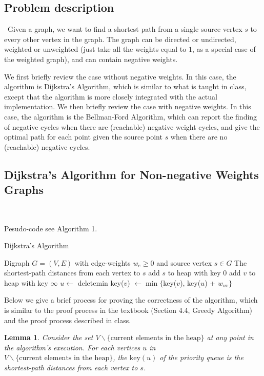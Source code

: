 \documentclass[11pt]{article}
\theoremstyle{plain}
\newtheorem{lemma}{Lemma}[section]
\begin{document}
\subsection{Problem description}\
Given a graph, we want to find a shortest path from a single source vertex $s$ to every other vertex 
in the graph. The graph can be directed or undirected, weighted or unweighted (just take all the 
weights equal to $1$, as a special case of the weighted graph), and can contain negative weights.

We first briefly review the case without negative weights. In this case, the algorithm is Dijkstra's 
Algorithm, which is similar to what is taught in class, except that the algorithm is more closely 
integrated with the actual implementation. We then briefly review the case with negative weights. 
In this case, the algorithm is the Bellman-Ford Algorithm, which can report the finding of negative 
cycles when there are (reachable) negative weight cycles, and give the optimal path for each point 
given the source point $s$ when there are no (reachable) negative cycles.

\subsection{Dijkstra's Algorithm for Non-negative Weights Graphs}\

Pesudo-code see Algorithm 1.

\begin{algorithm}
  \caption{Dijkstra's Algorithm}
  \begin{algorithmic}[1]
  \REQUIRE Digraph $G = (V, E)$ with edge-weights $w_e \geq 0$ and source vertex $s \in G$
  \ENSURE The shortest-path distances from each vertex to $s$
  \STATE add $s$ to heap with key $0$
      \STATE add $v$ to heap with key $\infty$
  \ENDFOR
      \STATE $u \leftarrow$ deletemin
          \STATE key($v$) $\leftarrow \min\{$key($v$), key($u$) + $w_{uv}\}$ 
      \ENDFOR
  \ENDWHILE
  \end{algorithmic}
  \end{algorithm}

  Below we give a brief process for proving the correctness of the algorithm, which is similar to 
  the proof process in the textbook (Section 4.4, Greedy Algorithm) and the proof process described in class.

  \begin{lemma}
    Consider the set $V \backslash \{\text{current elements in the heap}\}$ at any point in the 
    algorithm's execution. For each vertices $u$ in $V \backslash \{\text{current elements in the heap}\}$, 
    the $\text{key}(u)$ of the priority queue is the shortest-path distances from each vertex to $s$.
  \end{lemma}
\end{document}
